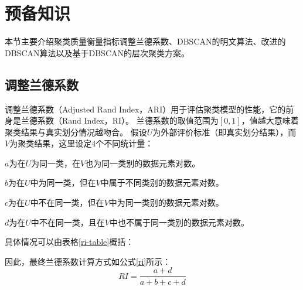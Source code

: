 \section{预备知识}
\label{s4-yubei}
本节主要介绍聚类质量衡量指标调整兰德系数、DBSCAN的明文算法、改进的DBSCAN算法以及基于DBSCAN的层次聚类方案。

\subsection{调整兰德系数}
\label{s4-ari-intro}
调整兰德系数（Adjusted Rand Index，ARI）\cite{hubert1985comparing}用于评估聚类模型的性能，它的前身是兰德系数（Rand Index，RI）。
兰德系数的取值范围为$ [0,1] $，值越大意味着聚类结果与真实划分情况越吻合。
假设$ U $为外部评价标准（即真实划分结果），而$ V $为聚类结果，这里设定4个不同统计量：
\begin{compactitem}
	\item $ a $为在$ U $为同一类，在$ V $也为同一类别的数据元素对数。
	\item $ b $为在$ U $中为同一类，但在$ V $中属于不同类别的数据元素对数。
	\item $ c $为在$ U $中不在同一类，但在$ V $中为同一类别的数据元素对数。
	\item $ d $为在$ U $中不在同一类，且在$ V $中也不属于同一类别的数据元素对数。
\end{compactitem}

具体情况可以由表格\ref{ri-table}概括：

\begin{table}[htbp]
	\centering
	\renewcommand{\arraystretch}{1.3}
	\caption{RI指标计算参数解释}
	\label{ri-table}
\end{table}

因此，最终兰德系数计算方式如公式\ref{ri}所示：
\begin{equation}
	R I=\frac{a+d}{a+b+c+d}
	\label{ri}
\end{equation}


